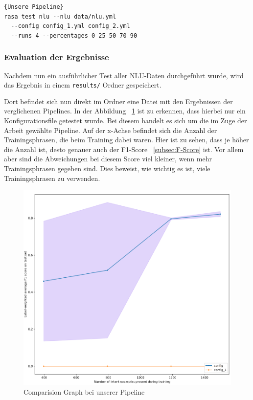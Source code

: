 \begin{lstlisting}[label={lst:comparing-pipelines-custom},caption={Unsere Pipeline}]{Unsere Pipeline}
rasa test nlu --nlu data/nlu.yml
  --config config_1.yml config_2.yml
  --runs 4 --percentages 0 25 50 70 90
\end{lstlisting}

\subsubsection{Evaluation der Ergebnisse}\label{subsubsec:evaluation-results}

Nachdem nun ein ausführlicher Test aller NLU-Daten durchgeführt wurde, wird das Ergebnis in einem \texttt{results/} Ordner gespeichert.\cite{interpretingTheOutput}

Dort befindet sich nun direkt im Ordner eine Datei mit den Ergebnissen der verglichenen Pipelines.
In der Abbildung ~\ref{fig:comparision_graph} ist zu erkennen, dass hierbei nur ein Konfigurationsfile getestet wurde.
Bei diesem handelt es sich um die im Zuge der Arbeit gewählte Pipeline.
Auf der x-Achse befindet sich die Anzahl der Trainingsphrasen, die beim Training dabei waren.
Hier ist zu sehen, dass je höher die Anzahl ist, desto genauer auch der F1-Score ~\ref{subsec:F-Score} ist.
Vor allem aber sind die Abweichungen bei diesem Score viel kleiner, wenn mehr Trainingsphrasen gegeben sind.
Dies beweist, wie wichtig es ist, viele Trainingsphrasen zu verwenden.

\begin{figure}[hbt!]
    \centering
    \includegraphics[scale=0.4]{pics/comparision_graph}
    \caption{Comparision Graph bei unserer Pipeline}
    \label{fig:comparision_graph}
\end{figure}

